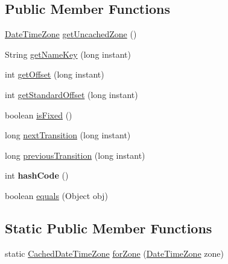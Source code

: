 \subsection*{Public Member Functions}
\begin{DoxyCompactItemize}
\item 
\hyperlink{classorg_1_1joda_1_1time_1_1_date_time_zone}{Date\-Time\-Zone} \hyperlink{classorg_1_1joda_1_1time_1_1tz_1_1_cached_date_time_zone_abb19ee1aa9bf4b405337333bba6a2338}{get\-Uncached\-Zone} ()
\item 
String \hyperlink{classorg_1_1joda_1_1time_1_1tz_1_1_cached_date_time_zone_ab5c76ee0f8554fb67c865894712091f4}{get\-Name\-Key} (long instant)
\item 
int \hyperlink{classorg_1_1joda_1_1time_1_1tz_1_1_cached_date_time_zone_a747f6f9f8f5d60d0d638f7c762c33a48}{get\-Offset} (long instant)
\item 
int \hyperlink{classorg_1_1joda_1_1time_1_1tz_1_1_cached_date_time_zone_aa04f6b0911bd785681face8b3a0a7d16}{get\-Standard\-Offset} (long instant)
\item 
boolean \hyperlink{classorg_1_1joda_1_1time_1_1tz_1_1_cached_date_time_zone_a245cefd729431e2ada62e1565048c948}{is\-Fixed} ()
\item 
long \hyperlink{classorg_1_1joda_1_1time_1_1tz_1_1_cached_date_time_zone_a615c1933c9395819432703636b5eeeab}{next\-Transition} (long instant)
\item 
long \hyperlink{classorg_1_1joda_1_1time_1_1tz_1_1_cached_date_time_zone_a799cabf6a90a81a8e7da2f58b98411d3}{previous\-Transition} (long instant)
\item 
\hypertarget{classorg_1_1joda_1_1time_1_1tz_1_1_cached_date_time_zone_a416af980dc94ca7cf63dbfa14bf80148}{int {\bfseries hash\-Code} ()}\label{classorg_1_1joda_1_1time_1_1tz_1_1_cached_date_time_zone_a416af980dc94ca7cf63dbfa14bf80148}

\item 
boolean \hyperlink{classorg_1_1joda_1_1time_1_1tz_1_1_cached_date_time_zone_a0e61ee966eb500f2f61eeeef32f8b47c}{equals} (Object obj)
\end{DoxyCompactItemize}
\subsection*{Static Public Member Functions}
\begin{DoxyCompactItemize}
\item 
static \hyperlink{classorg_1_1joda_1_1time_1_1tz_1_1_cached_date_time_zone}{Cached\-Date\-Time\-Zone} \hyperlink{classorg_1_1joda_1_1time_1_1tz_1_1_cached_date_time_zone_ae1a2b19b020e51bbb773b2c8107d732e}{for\-Zone} (\hyperlink{classorg_1_1joda_1_1time_1_1_date_time_zone}{Date\-Time\-Zone} zone)
\end{DoxyCompactItemize}
